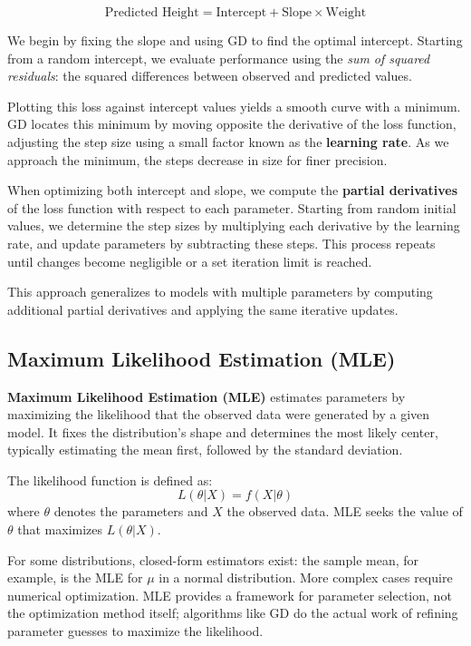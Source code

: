 \begin{equation}
    \text{Predicted Height} = \text{Intercept} + \text{Slope} \times \text{Weight}
\end{equation}

We begin by fixing the slope and using GD to find the optimal intercept. Starting from a random intercept, we evaluate performance using the \textit{sum of squared residuals}: the squared differences between observed and predicted values.

Plotting this loss against intercept values yields a smooth curve with a minimum. GD locates this minimum by moving opposite the derivative of the loss function, adjusting the step size using a small factor known as the \textbf{learning rate}. As we approach the minimum, the steps decrease in size for finer precision.

When optimizing both intercept and slope, we compute the \textbf{partial derivatives} of the loss function with respect to each parameter. Starting from random initial values, we determine the step sizes by multiplying each derivative by the learning rate, and update parameters by subtracting these steps. This process repeats until changes become negligible or a set iteration limit is reached.

This approach generalizes to models with multiple parameters by computing additional partial derivatives and applying the same iterative updates.

\subsection{Maximum Likelihood Estimation (MLE)}
\textbf{Maximum Likelihood Estimation (MLE)} estimates parameters by maximizing the likelihood that the observed data were generated by a given model. It fixes the distribution's shape and determines the most likely center, typically estimating the mean first, followed by the standard deviation.

The likelihood function is defined as:
\begin{equation}
L(\theta | X) = f(X | \theta)
\end{equation}
where $\theta$ denotes the parameters and $X$ the observed data. MLE seeks the value of $\theta$ that maximizes $L(\theta | X)$.

For some distributions, closed-form estimators exist: the sample mean, for example, is the MLE for $\mu$ in a normal distribution. More complex cases require numerical optimization. MLE provides a framework for parameter selection, not the optimization method itself; algorithms like GD do the actual work of refining parameter guesses to maximize the likelihood.


